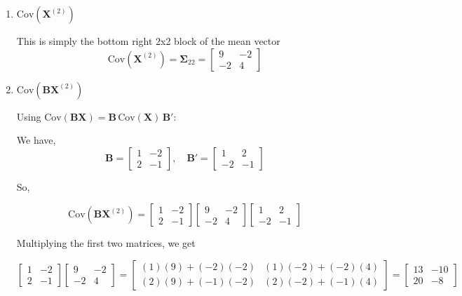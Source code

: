 \documentclass[12pt]{article}
\begin{document}
\begin{enumerate}
$$
\boxed{
E(\mathbf{B}\mathbf{X}^{(2)}) = \begin{bmatrix} 0 \\ 3 \end{bmatrix}
}
$$

\item[(g)] $\text{Cov}(\mathbf{X}^{(2)})$

\noindent This is simply the bottom right 2x2 block of the mean vector
$$
\boxed{
\text{Cov}(\mathbf{X}^{(2)}) = \boldsymbol{\Sigma}_{22} = \begin{bmatrix} 9 & -2 \\ -2 & 4 \end{bmatrix}
}
$$

\item[(h)] $\text{Cov}(\mathbf{B}\mathbf{X}^{(2)})$

\vspace{0.5em}

\noindent Using $\text{Cov}(\mathbf{B}\mathbf{X}) = \mathbf{B}\,\text{Cov}(\mathbf{X})\,\mathbf{B}'$:

We have,
$$
\mathbf{B} = \begin{bmatrix} 1 & -2 \\ 2 & -1 \end{bmatrix}, \hspace{1em} \mathbf{B'} = \begin{bmatrix} 1 & 2 \\ -2 & -1 \end{bmatrix}
$$

\noindent So, 

$$
\text{Cov}(\mathbf{B}\mathbf{X}^{(2)}) = \begin{bmatrix} 1 & -2 \\ 2 & -1 \end{bmatrix} \begin{bmatrix} 9 & -2 \\ -2 & 4 \end{bmatrix}  \begin{bmatrix} 1 & 2 \\ -2 & -1 \end{bmatrix}
$$

Multiplying the first two matrices, we get

$$
\begin{bmatrix} 1 & -2 \\ 2 & -1 \end{bmatrix}
\begin{bmatrix} 9 & -2 \\ -2 & 4 \end{bmatrix}
=
\begin{bmatrix} (1)(9)+(-2)(-2) & (1)(-2)+(-2)(4) \\ (2)(9)+(-1)(-2) & (2)(-2)+(-1)(4) \end{bmatrix}
=
\begin{bmatrix} 13 & -10 \\ 20 & -8 \end{bmatrix}
$$


\end{enumerate}
\end{document}
